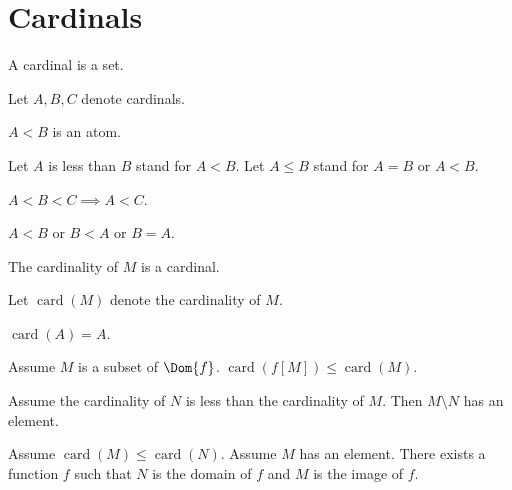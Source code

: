 \documentclass{article}
\newcommand{\card}[1]{\operatorname{card}(#1)}
\begin{document}
  \section{Cardinals}

\begin{forthel}
    \begin{signature}
      A cardinal is a set.
    \end{signature}

    Let $A,B,C$ denote cardinals.
    \begin{signature}
      $A < B$ is an atom.
    \end{signature}

    Let $A$ is less than $B$ stand for $A < B$.
    Let $A \leq B$ stand for $A = B$ or $A < B$.

    \begin{axiom}
      $A < B < C \implies A < C$.
    \end{axiom}

    \begin{axiom}
      $A < B$ or $B < A$ or $B = A$.
    \end{axiom}

    \begin{signature}
      The cardinality of $M$ is a cardinal.
    \end{signature}

    Let $\card{M}$ denote the cardinality of $M$.

    \begin{axiom}
      $\card{A} = A$.
    \end{axiom}

    \begin{axiom}[ImageCard]
      Assume $M$ is a subset of $\Dom{f}$. $\card{f[M]} \leq \card{M}$.
    \end{axiom}

    \begin{axiom}
      Assume the cardinality of $N$ is less than the cardinality of $M$.
Then $M \setminus N$ has an element.
    \end{axiom}

    \begin{axiom}[SurjExi]
      Assume $\card{M} \leq \card{N}$. Assume $M$ has an element. There exists a
      function $f$ such that $N$ is the domain of $f$ and $M$ is the image of $f$.
    \end{axiom}

\end{forthel}
\end{document}
